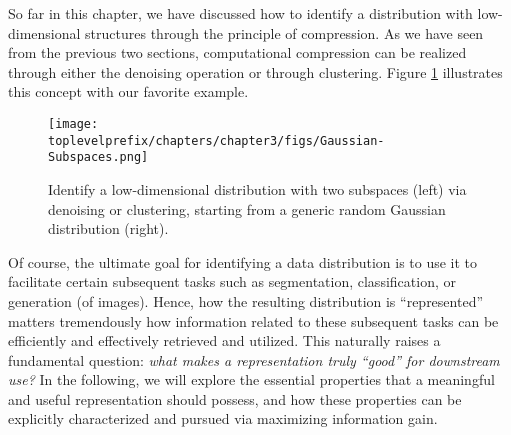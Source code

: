 \documentclass[../../book-main.tex]{subfiles}
\begin{document}

So far in this chapter, we have discussed how to identify a distribution with low-dimensional structures through the principle of compression. As we have seen from the previous two sections, computational compression can be realized through either the denoising operation or through clustering. Figure \ref{fig:Gaussian-Subspaces} illustrates this concept with our favorite example.
\begin{figure}[t]
    \centering
    \texttt{[image: \\toplevelprefix/chapters/chapter3/figs/Gaussian-Subspaces.png]}
    \caption{Identify a low-dimensional distribution with two subspaces (left) via denoising or clustering, starting from a generic random Gaussian distribution (right).}
    \label{fig:Gaussian-Subspaces}
\end{figure}
Of course, the ultimate goal for identifying a data distribution is to use it to facilitate certain subsequent tasks such as segmentation, classification, or generation (of images). Hence, how the resulting distribution is ``represented'' matters tremendously how information related to these subsequent tasks can be efficiently and effectively retrieved and utilized. This naturally raises a fundamental question: {\em what makes a representation truly ``good'' for downstream use?} In the following, we will explore the essential properties that a meaningful and useful representation should possess, and how these properties can be explicitly characterized and pursued via maximizing information gain.  

\end{document}
